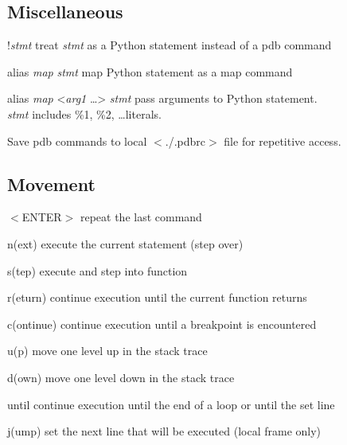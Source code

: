 \documentclass[10pt,landscape,a4paper]{article}
\newcommand{\keystroke}[1]{$<$#1$>$}
\begin{document}
\begin{multicols}{2}
    \subsection{Miscellaneous}
      \begin{eqlist}
        \item[!\textit{stmt}] treat \textit{stmt} as a Python statement instead of a pdb command
        \item[alias \textit{map} \textit{stmt}] map Python statement as a map command
        \item[alias \textit{map} <\textit{arg1} \ldots> \textit{stmt}] pass arguments to Python statement. \\
            \textit{stmt} includes \%1, \%2, \ldots literals.
      \end{eqlist}
      Save pdb commands to local \keystroke{./.pdbrc} file for repetitive access.

    \subsection{Movement}
      \begin{eqlist}
        \item[\keystroke{ENTER}] repeat the last command
        \item[n(ext)] execute the current statement (step over)
        \item[s(tep)] execute and step into function
        \item[r(eturn)] continue execution until the current function returns
        \item[c(ontinue)] continue execution until a breakpoint is encountered
        \item[u(p)] move one level up in the stack trace
        \item[d(own)] move one level down in the stack trace
        \item[until] continue execution until the end of a loop or until the set line
        \item[j(ump)] set the next line that will be executed (local frame only)
      \end{eqlist}


\end{multicols}
\end{document}
